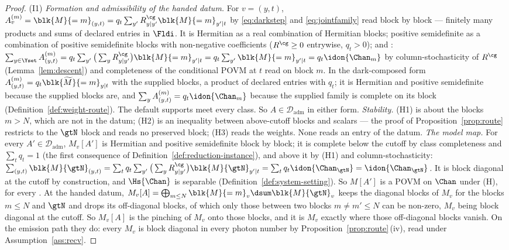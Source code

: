 \begin{proof}
(I1) \emph{Formation and admissibility of the handed datum.} For $v=(y,t)$,
$A^{(m)}_v=\blk{M}{=m}_{(y,t)}=q_t\sum_{y'}R^{\cg}_{y|y'}\blk{M}{=m}_{y'|t}$
by \eqref{eq:darkstep} and \eqref{eq:jointfamily} read block by block ---
finitely many products and sums of declared entries in $\Fldi$. It is
Hermitian as a real combination of Hermitian blocks; positive semidefinite as
a combination of positive semidefinite blocks with non-negative coefficients
($R^{\cg}\ge0$ entrywise, $q_t>0$); and :
$\sum_{y\in\Yset}A^{(m)}_{(y,t)}=q_t\sum_{y'}\big(\sum_yR^{\cg}_{y|y'}\big)
\blk{M}{=m}_{y'|t}=q_t\sum_{y'}\blk{M}{=m}_{y'|t}=q_t\idon{\Chan_m}$ by
column-stochasticity of $R^{\cg}$ (Lemma~\ref{lem:descent}) and completeness
of the conditional POVM at $t$ read on block $m$. In the dark-composed form
$A^{(m)}_{(y,t)}=q_t\blk{\widetilde M}{=m}_{y|t}$ with the supplied blocks,
a product of declared entries with $q_t$; it is Hermitian and positive
semidefinite because the supplied blocks are, and
$\sum_yA^{(m)}_{(y,t)}=q_t\idon{\Chan_m}$ because the supplied family is
complete on its block (Definition~\ref{def:weight-route}). The default
supports meet every class. So $A\in\mathcal{D}_{\mathrm{adm}}$ in either
form.
\emph{Stability.} (H1) is about the blocks $m>N$, which are not in the datum;
(H2) is an inequality between above-cutoff blocks and scalars --- the proof
of Proposition~\ref{prop:route} restricts to the $\gtN$ block and reads no
preserved block; (H3) reads the weights. None reads an entry of the datum.
\emph{The model map.} For every $A'\in\mathcal{D}_{\mathrm{adm}}$, $M_v[A']$
is Hermitian and positive semidefinite block by block; it is complete below
the cutoff by class completeness and $\sum_tq_t=1$ (the first consequence
of Definition~\ref{def:reduction-instance}), and above it by (H1) and
column-stochasticity: $\sum_{(y,t)}\blk{M}{\gtN}_{(y,t)}
=\sum_tq_t\sum_{y'}\big(\sum_yR^{\cg}_{y|y'}\big)\blk{M}{\gtN}_{y'|t}
=\sum_tq_t\idon{\Chan_{\gtN}}=\idon{\Chan_{\gtN}}$. It is block diagonal at
the cutoff by construction, and $\Hs{\Chan}$ is separable
(Definition~\ref{def:system-setting}). So $M[A']$ is a POVM on $\Chan$ under (H), for
every . At the handed datum,
$M_v[A]=\bigoplus_{m\le N}\blk{M}{=m}_v\dsum\blk{M}{\gtN}_v$ keeps the
diagonal blocks of $M_v$ for the blocks $m\le N$ and $\gtN$ and drops its
off-diagonal blocks, of which only those between two blocks $m\ne m'\le N$
can be non-zero, $M_v$ being block diagonal at the cutoff. So $M_v[A]$ is the
pinching of $M_v$ onto those blocks, and it is $M_v$ exactly where those
off-diagonal blocks vanish. On the emission path they do: every $M_v$ is
block diagonal in every photon number by Proposition~\ref{prop:route}\,(iv),
read under Assumption~\ref{ass:recv}.


\end{proof}
